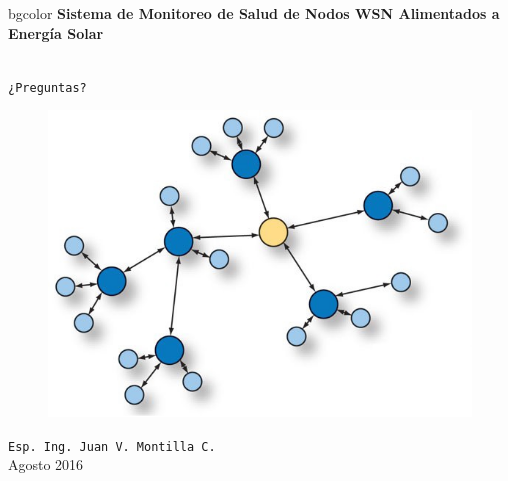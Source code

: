 \documentclass[aspectratio=43, handout]{beamer}
\begin{document}
\begingroup
\makeatletter
\setlength{\hoffset}{-.5\beamer@sidebarwidth}
\makeatother
\begin{frame}
\begin{center}
\hfill
    \begin{beamercolorbox}[center,dp=3ex,ht=10.25ex, wd=1\linewidth]{bgcolor}
        \Large\textbf{Sistema de Monitoreo de Salud de Nodos WSN Alimentados a Energía Solar}\\
    \end{beamercolorbox}
\hfill\hfill
\\
\vspace{5px}
\vspace{10px}
\texttt{\LARGE{¿Preguntas?}}\\

\vspace{10px}

\begin{figure}[H]
	\includegraphics[width=.3\textwidth]{./imagenes/red.jpg}
\end{figure}	
\vspace{10px}
\texttt{Esp. Ing. Juan V. Montilla C.}\\

\vspace{5px}
\tiny Agosto 2016 
 	  	
\end{center}
\end{frame}
\endgroup
\end{document}
